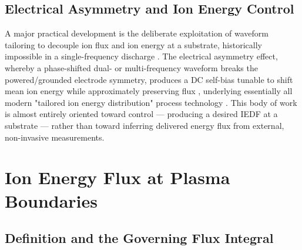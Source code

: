 \subsection{Electrical Asymmetry and Ion Energy Control}

A major practical development is the deliberate exploitation of waveform tailoring to decouple ion flux and ion energy at a substrate, historically impossible in a single-frequency discharge \cite{ref0105}. The electrical asymmetry effect, whereby a phase-shifted dual- or multi-frequency waveform breaks the powered/grounded electrode symmetry, produces a DC self-bias tunable to shift mean ion energy while approximately preserving flux \cite{ref0106}, underlying essentially all modern "tailored ion energy distribution" process technology \cite{ref0105}. This body of work is almost entirely oriented toward control — producing a desired IEDF at a substrate — rather than toward inferring delivered energy flux from external, non-invasive measurements.

\section{Ion Energy Flux at Plasma Boundaries}

\subsection{Definition and the Governing Flux Integral}

